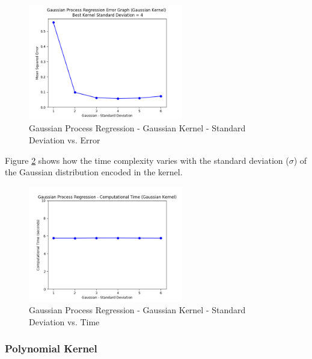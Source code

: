 \documentclass[parskip=full]{scrartcl}
\begin{document}
            \begin{figure}[ht]
                \centering
                \includegraphics[width=0.6\textwidth]{3c_gpr_gaussian_stddev_vs_error.png}
                \caption{Gaussian Process Regression - Gaussian Kernel - Standard Deviation vs. Error}
                \label{fig:gpr_gaussian_stddev_vs_error}
            \end{figure}

            Figure \ref{fig:gpr_gaussian_stddev_vs_time} shows how the time complexity varies with the standard deviation ($\sigma$) of the Gaussian distribution encoded in the kernel.

            \begin{figure}[ht]
                \centering
                \includegraphics[width=0.6\textwidth]{3c_gpr_gaussian_stddev_vs_time.png}
                \caption{Gaussian Process Regression - Gaussian Kernel - Standard Deviation vs. Time}
                \label{fig:gpr_gaussian_stddev_vs_time}
            \end{figure}
        

        \subsubsection*{Polynomial Kernel} %
        \label{ssub:polynomial_kernel}
\end{document}
